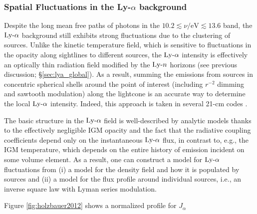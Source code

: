 \subsubsection{Spatial Fluctuations in the Ly-$\alpha$ background}
Despite the long mean free paths of photons in the $10.2 \lesssim \nu/\mathrm{eV} \lesssim 13.6$ band, the $\text{Ly-}\alpha$ background still exhibits strong fluctuations due to the clustering of sources. Unlike the kinetic temperature field, which is sensitive to fluctuations in the opacity along sightlines to different sources, the $\text{Ly-}\alpha$ intensity is effectively an optically thin radiation field modified by the $\text{Ly-}n$ horizons (see previous discussion; \S\ref{sec:lya_global}). As a result, summing the emissions from sources in concentric spherical shells around the point of interest (including $r^{-2}$ dimming and sawtooth modulation) along the lightcone is an accurate way to determine the local $\text{Ly-}\alpha$ intensity. Indeed, this approach is taken in several 21-cm codes \cite{Mesinger2011,Fialkov2014b}. 

The basic structure in the $\text{Ly-}\alpha$ field is well-described by analytic models thanks to the effectively negligible IGM opacity and the fact that the radiative coupling coefficients depend only on the instantaneous $\text{Ly-}\alpha$ flux, in contrast to, e.g., the IGM temperature, which depends on the entire history of emission incident on some volume element. As a result, one can construct a model for $\text{Ly-}\alpha$ fluctuations from (i) a model for the density field and how it is populated by sources and (ii) a model for the flux profile around individual sources, i.e., an inverse square law with Lyman series modulation.

Figure \ref{fig:holzbauer2012} shows a normalized profile for $J_{\alpha}$

